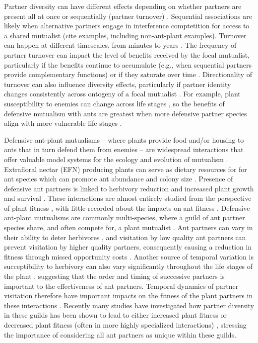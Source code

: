 \documentclass[11pt]{article}
\begin{document}
Partner diversity can have different effects depending on whether partners are present all at once or sequentially (partner turnover) \citep{Djieto-Lordon2005, Ness2006, Bruna2014}. 
Sequential associations are likely when alternative partners engage in interference comptetition for access to a shared mutualist (cite examples, including non-ant-plant examples). 
Turnover can happen at different timescales, from minutes to years \citep{Oliveira1999,Horvitz1986}. 
The frequency of partner turnover can impact the level of benefits received by the focal mutualist, particularly if the benefits continue to accumulate (e.g., when sequential partners provide complementary functions) or if they saturate over time \citep{Sachs2004}.
Directionality of turnover can also influence diversity effects, particularly if partner identity changes consistently across ontogeny of a focal mutualist \citep{Fonseca2003}.
For example, plant susceptibility to enemies can change across life stages \citep{Boege2005,Barton2010}, so the benefits of defensive mutualism with ants are greatest when more defensive partner species align with more vulnerable life stages \citep{Djieto-Lordon2005}.

Defensive ant-plant mutualisms -- where plants provide food and/or housing to ants that in turn defend them from enemies -- are widespread interactions that offer valuable model systems for the ecology and evolution of mutualism \citep{Bronstein1998, Bronstein2006}. 
Extrafloral nectar (EFN) producing plants can serve as dietary resources for for ant species which can promote ant abundance and colony size \citep{Byk2011, Ness2009, Ness2006}.
Presence of defensive ant partners is linked to herbivory reduction \citep{Trager2010, Rudgers2010} and increased plant growth and survival \citep{Baez2016}.
These interactions are almost entirely studied from the perspective of plant fitness \citep{Bronstein1994,Bronstein1998}, with little recorded about the impacts on ant fitness \citep{Lanan2013}.
Defensive ant-plant mutualisms are commonly multi-species, where a guild of ant partner species share, and often compete for, a plant mutualist \citep{Bronstein1998, Beattie1985, Trager2010, Agrawal1998}.
Ant partners can vary in their ability to deter herbivores \citep{bruna2004}, and visitation by low quality ant partners can prevent visitation by higher quality partners, consequently causing a reduction in fitness through missed opportunity costs \citep{Fraser2001, Frederickson2005}.
Another source of temporal variation is succeptibility to herbivory can also vary significantly throughout the life stages of the plant \citep{Boege2005}, suggesting that the order and timing of successive partners is important to the effectiveness of ant partners.
Temporal dynamics of partner visitation therefore have important impacts on the fitness of the plant partners in these interactions \citep{Barton2010, Boege2005, Fonseca2003}.
Recently many studies have investigated how partner diversity in these guilds has been shown to lead to either increased plant fitness \citep{Palmer2010, Afkhami2014} or decreased plant fitness (often in more highly specialized interactions) \citep{Barrett2015, Ushio2020}, stressing the importance of considering all ant partners as unique within these guilds. 
\end{document}
